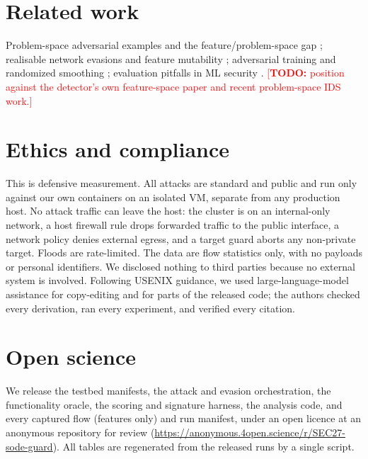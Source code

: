 \documentclass[letterpaper,twocolumn,10pt]{article}
\newcommand{\todo}[1]{\textcolor{red}{[\textbf{TODO:} #1]}}
\begin{document}
\section{Related work}\label{sec:related}
Problem-space adversarial examples and the feature/problem-space gap
\cite{pierazzi2020problemspace}; realisable network evasions and feature
mutability \cite{apruzzese2023realworld}; adversarial training and randomized
smoothing \cite{madry2018,cohen2019}; evaluation pitfalls in ML security
\cite{arp2022dodo,carlini2019evaluating}. \todo{position against the detector's
own feature-space paper and recent problem-space IDS work.}

\section{Ethics and compliance}\label{sec:ethics}
This is defensive measurement. All attacks are standard and public and run only
against our own containers on an isolated VM, separate from any production host.
No attack traffic can leave the host: the cluster is on an internal-only network,
a host firewall rule drops forwarded traffic to the public interface, a network
policy denies external egress, and a target guard aborts any non-private target.
Floods are rate-limited. The data are flow statistics only, with no payloads or
personal identifiers. We disclosed nothing to third parties because no external
system is involved. Following USENIX guidance, we used large-language-model
assistance for copy-editing and for parts of the released code; the authors
checked every derivation, ran every experiment, and verified every citation.

\section{Open science}\label{sec:openscience}
We release the testbed manifests, the attack and evasion orchestration, the
functionality oracle, the scoring and signature harness, the analysis code, and
every captured flow (features only) and run manifest, under an open licence at an
anonymous repository for review (\url{https://anonymous.4open.science/r/SEC27-sode-guard}).
All tables are regenerated from the released runs by a single script.

{\footnotesize  }
\end{document}

